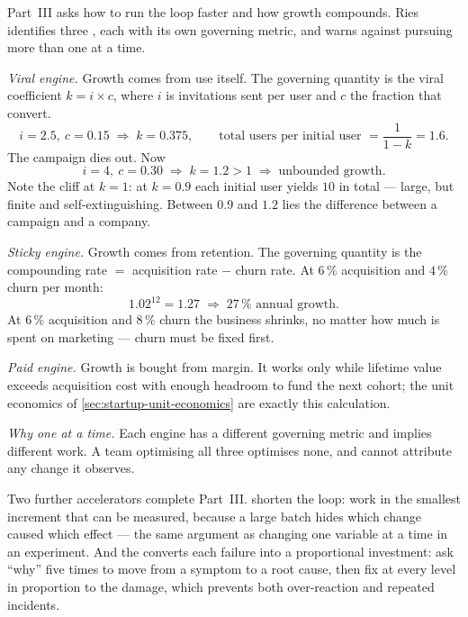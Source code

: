 Part~III asks how to run the loop faster and how growth compounds. Ries
identifies three , each with its own governing
metric, and warns against pursuing more than one at a time.

\begin{workedexample}
\emph{Viral engine.} Growth comes from use itself. The governing quantity is
the viral coefficient $k = i \times c$, where $i$ is invitations sent per user
and $c$ the fraction that convert.
\[
  i = 2.5,\ c = 0.15 \;\Rightarrow\; k = 0.375,
  \qquad
  \text{total users per initial user } = \frac{1}{1-k} = 1.6 .
\]
The campaign dies out. Now
\[
  i = 4,\ c = 0.30 \;\Rightarrow\; k = 1.2 > 1 \;\Rightarrow\;
  \text{unbounded growth.}
\]
Note the cliff at $k=1$: at $k = 0.9$ each initial user yields $10$ in total
--- large, but finite and self-extinguishing. Between $0.9$ and $1.2$ lies the
difference between a campaign and a company.

\emph{Sticky engine.} Growth comes from retention. The governing quantity is
the compounding rate $=$ acquisition rate $-$ churn rate. At $6\,\%$
acquisition and $4\,\%$ churn per month:
\[
  1.02^{12} = 1.27 \;\Rightarrow\; 27\,\% \text{ annual growth.}
\]
At $6\,\%$ acquisition and $8\,\%$ churn the business shrinks, no matter how
much is spent on marketing --- churn must be fixed first.

\emph{Paid engine.} Growth is bought from margin. It works only while
lifetime value exceeds acquisition cost with enough headroom to fund the next
cohort; the unit economics of \cref{sec:startup-unit-economics} are exactly
this calculation.

\emph{Why one at a time.} Each engine has a different governing metric and
implies different work. A team optimising all three optimises none, and cannot
attribute any change it observes.
\end{workedexample}

Two further accelerators complete Part~III.  shorten
the loop: work in the smallest increment that can be measured, because a large
batch hides which change caused which effect --- the same argument as changing
one variable at a time in an experiment. And the  converts
each failure into a proportional investment: ask ``why'' five times to move
from a symptom to a root cause, then fix at every level in proportion to the
damage, which prevents both over-reaction and repeated incidents.

